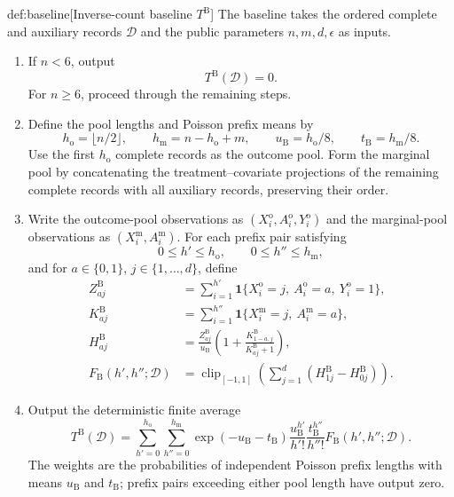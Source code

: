 \begin{algorithmv}{def:baseline}[Inverse-count baseline $T^{\mathrm B}$]
The baseline takes the ordered complete and auxiliary records \(\mathcal D\) and the public parameters \(n,m,d,\epsilon\) as inputs.
\begin{enumerate}
\item If \(n<6\), output
\[
T^{\mathrm B}(\mathcal D)=0.
\]
For \(n\ge6\), proceed through the remaining steps.

\item Define the pool lengths and Poisson prefix means by
\[
h_{\mathrm o}=\lfloor n/2\rfloor,\qquad
h_{\mathrm m}=n-h_{\mathrm o}+m,\qquad
u_{\mathrm B}=h_{\mathrm o}/8,\qquad
t_{\mathrm B}=h_{\mathrm m}/8.
\]
Use the first \(h_{\mathrm o}\) complete records as the outcome pool. Form the marginal pool by concatenating the treatment--covariate projections of the remaining complete records with all auxiliary records, preserving their order.

\item Write the outcome-pool observations as
\((X_i^{\mathrm o},A_i^{\mathrm o},Y_i^{\mathrm o})\) and the marginal-pool observations as
\((X_i^{\mathrm m},A_i^{\mathrm m})\). For each prefix pair satisfying
\[
0\le h'\le h_{\mathrm o},\qquad
0\le h''\le h_{\mathrm m},
\]
and for \(a\in\{0,1\}\), \(j\in\{1,\ldots,d\}\), define
\[
\begin{aligned}
Z_{aj}^{\mathrm B}
&=\sum_{i=1}^{h'}
\mathbf1\{X_i^{\mathrm o}=j,\ A_i^{\mathrm o}=a,\ Y_i^{\mathrm o}=1\},\\
K_{aj}^{\mathrm B}
&=\sum_{i=1}^{h''}
\mathbf1\{X_i^{\mathrm m}=j,\ A_i^{\mathrm m}=a\},\\
H_{aj}^{\mathrm B}
&=\frac{Z_{aj}^{\mathrm B}}{u_{\mathrm B}}
\left(1+\frac{K_{1-a,j}^{\mathrm B}}{K_{aj}^{\mathrm B}+1}\right),\\
F_{\mathrm B}(h',h'';\mathcal D)
&=\operatorname{clip}_{[-1,1]}
\left(\sum_{j=1}^d(H_{1j}^{\mathrm B}-H_{0j}^{\mathrm B})\right).
\end{aligned}
\]

\item Output the deterministic finite average
\[
T^{\mathrm B}(\mathcal D)
=
\sum_{h'=0}^{h_{\mathrm o}}\sum_{h''=0}^{h_{\mathrm m}}
\exp(-u_{\mathrm B}-t_{\mathrm B})
\frac{u_{\mathrm B}^{h'}}{h'!}
\frac{t_{\mathrm B}^{h''}}{h''!}
F_{\mathrm B}(h',h'';\mathcal D).
\]
The weights are the probabilities of independent Poisson prefix lengths with means \(u_{\mathrm B}\) and \(t_{\mathrm B}\); prefix pairs exceeding either pool length have output zero.
\end{enumerate}
\end{algorithmv}

